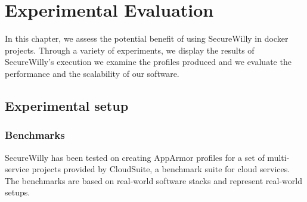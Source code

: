 \chapter{Experimental Evaluation}

In this chapter, we assess the potential benefit of using SecureWilly in docker projects. Through a variety of experiments, we display the results of SecureWilly's execution we examine the profiles produced and we evaluate the performance and the scalability of our software.

\section{Experimental setup}
\subsection{Benchmarks}
SecureWilly has been tested on creating AppArmor profiles for a set of multi-service projects provided by CloudSuite, a benchmark suite for cloud services. \cite{cloudsuite} The benchmarks are based on real-world software stacks and represent real-world setups. 

